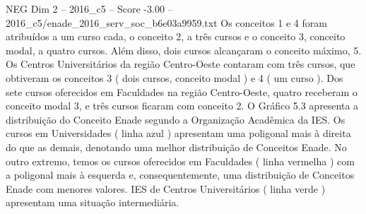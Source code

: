 \begin{textsample}{NEG Dim 2 – 2016\_c5 – Score -3.00 – 2016\_c5/enade\_2016\_serv\_soc\_b6e03a9959.txt}
Os conceitos 1 e 4 foram atribuídos a um curso cada, o conceito 2, a três cursos e o conceito 3, conceito modal, a quatro cursos.
Além disso, dois cursos alcançaram o conceito máximo, 5.
Os Centros Universitários da região Centro-Oeste contaram com três cursos, que obtiveram os conceitos 3 ( dois cursos, conceito modal ) e 4 ( um curso ).
Dos sete cursos oferecidos em Faculdades na região Centro-Oeste, quatro receberam o conceito modal 3, e três cursos ficaram com conceito 2.
O Gráfico 5.3 apresenta a distribuição do Conceito Enade segundo a Organização Acadêmica da IES.
Os cursos em Universidades ( linha azul ) apresentam uma poligonal mais à direita do que as demais, denotando uma melhor distribuição de Conceitos Enade.
No outro extremo, temos os cursos oferecidos em Faculdades ( linha vermelha ) com a poligonal mais à esquerda e, consequentemente, uma distribuição de Conceitos Enade com menores valores.
IES de Centros Universitários ( linha verde ) apresentam uma situação intermediária.

\end{textsample}

